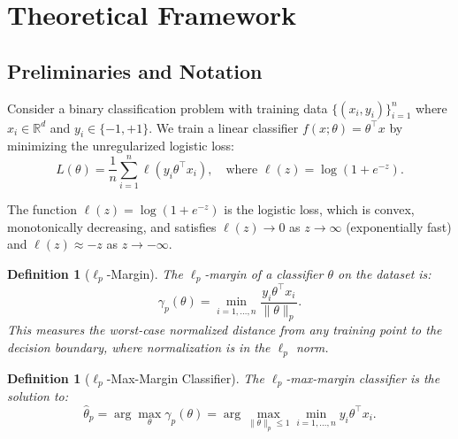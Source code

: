 \documentclass{article}
\newtheorem{definition}[theorem]{Definition}
\begin{document}
\section{Theoretical Framework}
\label{sec:theory}

\subsection{Preliminaries and Notation}
\label{sec:prelim}

Consider a binary classification problem with training data $\{(x_i, y_i)\}_{i=1}^n$ where $x_i \in \mathbb{R}^d$ and $y_i \in \{-1, +1\}$. We train a linear classifier $f(x; \theta) = \theta^\top x$ by minimizing the unregularized logistic loss:
\begin{equation}
    L(\theta) = \frac{1}{n} \sum_{i=1}^n \ell(y_i \theta^\top x_i), \quad \text{where } \ell(z) = \log(1 + e^{-z}).
    \label{eq:logistic_loss}
\end{equation}

The function $\ell(z) = \log(1 + e^{-z})$ is the logistic loss, which is convex, monotonically decreasing, and satisfies $\ell(z) \to 0$ as $z \to \infty$ (exponentially fast) and $\ell(z) \approx -z$ as $z \to -\infty$.

\begin{definition}[$\ell_p$-Margin]
The $\ell_p$-margin of a classifier $\theta$ on the dataset is:
\begin{equation}
    \gamma_p(\theta) = \min_{i=1,\ldots,n} \frac{y_i \theta^\top x_i}{\|\theta\|_p}.
\end{equation}
This measures the worst-case normalized distance from any training point to the decision boundary, where normalization is in the $\ell_p$ norm.
\end{definition}

\begin{definition}[$\ell_p$-Max-Margin Classifier]
\label{def:maxmargin}
The $\ell_p$-max-margin classifier is the solution to:
\begin{equation}
    \hat{\theta}_p = \arg\max_{\theta} \gamma_p(\theta) = \arg\max_{\|\theta\|_p \leq 1} \min_{i=1,\ldots,n} y_i \theta^\top x_i.
    \label{eq:max_margin}
\end{equation}
\end{definition}
\end{document}

